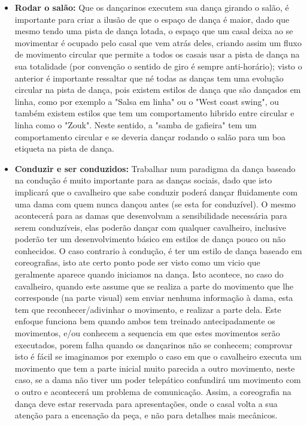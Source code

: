 \begin{itemize}
\item \textbf{Rodar o salão:} Que os dançarinos executem sua dança girando o salão, 
é importante para criar a ilusão de que o espaço de dança é maior, dado que mesmo
tendo uma pista de dança lotada, o espaço que um
casal deixa ao se movimentar é ocupado pelo casal que vem atrás deles, criando 
assim um fluxo de movimento circular que permite a todos os casais usar a pista de dança
na sua totalidade (por convenção o sentido de giro é sempre anti-horário); 
visto o anterior é importante ressaltar que né todas as danças tem
uma evolução circular na pista de dança, pois existem estilos de dança que são dançados em linha,
como por exemplo a "Salsa em linha" ou o "West coast swing", ou também existem estilos que
tem um comportamento hibrido entre circular e linha como o "Zouk". Neste sentido,
a "samba de gafieira"  tem um comportamento circular e se deveria dançar
rodando o salão para um boa etiqueta na pista de dança.
\item \textbf{Conduzir e ser conduzidos:} Trabalhar num paradigma da dança baseado
na condução é muito importante para as danças sociais, dado que isto implicará
que o cavalheiro  que sabe conduzir poderá dançar fluidamente com uma dama com quem nunca dançou
antes (se esta for conduzível). O mesmo acontecerá para as damas que desenvolvam
a sensibilidade necessária para serem conduzíveis, elas poderão dançar com qualquer
cavalheiro, inclusive poderão ter um desenvolvimento básico em estilos de dança pouco ou não conhecidos.
O caso contrario à condução, é ter um estilo de dança baseado em coreografias,
isto ate certo ponto pode ser visto como um vicio que geralmente aparece quando iniciamos
na dança. Isto acontece, no caso do cavalheiro, quando este assume que se realiza a parte do movimento 
que lhe corresponde (na parte visual) sem enviar nenhuma informação à dama, 
esta tem que reconhecer/adivinhar o movimento, e realizar a parte dela. Este enfoque
funciona bem quando ambos tem treinado antecipadamente os movimentos, e/ou conhecem a sequencia
em que estes movimentos serão executados, porem falha quando os dançarinos não se conhecem;
comprovar isto é fácil se imaginamos por exemplo o caso em que o cavalheiro executa um movimento
que tem a parte inicial muito parecida a outro movimento, neste caso, se a dama não tiver
um poder telepático confundirá um movimento com o outro e acontecerá um problema de comunicação. Assim, a coreografia
na dança deve estar reservada para apresentações, onde o casal volta 
a sua atenção para a encenação da peça, e não para detalhes mais mecânicos.


\end{itemize}
